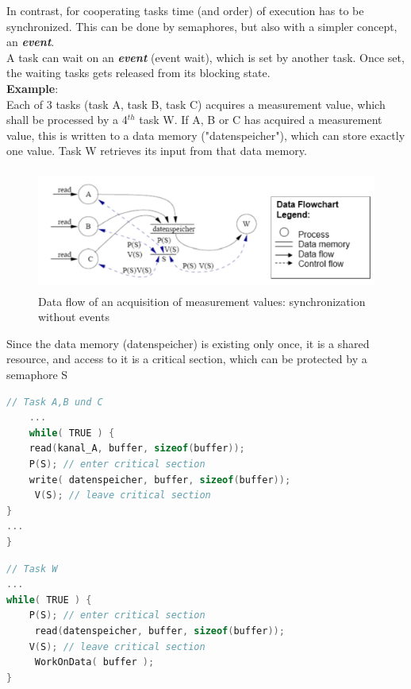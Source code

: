 In contrast, for cooperating tasks time (and order) of execution has to be synchronized. This can be done by semaphores, but also with a simpler concept, an \textbf{\textit{event}}.\\

A task can wait on an \textbf{\textit{event}} (event wait), which is set by another task. Once set, the waiting tasks gets released from its blocking state.\\

\textbf{Example}: \\
Each of 3 tasks (task A, task B, task C) acquires a measurement value, which shall be processed by a 4${}^{th}$ task W. If A, B or C has acquired a measurement value, this is written to a data memory ("datenspeicher"), which can store exactly one value. Task W retrieves its input from that data memory.

 	\begin{figure}[h]
    \centering
    \includegraphics[width=13cm, height=4cm]{Images/image111.png}
    \caption{Data flow of an acquisition of measurement values: synchronization without events}
    \label{fig:Fig 57}
    \end{figure}

Since the data memory (datenspeicher) is existing only once, it is a shared resource, and access to it is a critical section, which can be protected by a semaphore S\\

\begin{lstlisting}[style=mystyle, language=c]
// Task A,B und C
	...
	while( TRUE ) {
  	read(kanal_A, buffer, sizeof(buffer));
  	P(S); // enter critical section
  	write( datenspeicher, buffer, sizeof(buffer));
 	 V(S); // leave critical section
}
...
}
\end{lstlisting}

\begin{lstlisting}[style=mystyle, language=c]
// Task W
...
while( TRUE ) {
  	P(S); // enter critical section
 	 read(datenspeicher, buffer, sizeof(buffer));
  	V(S); // leave critical section
 	 WorkOnData( buffer );
}
\end{lstlisting}

